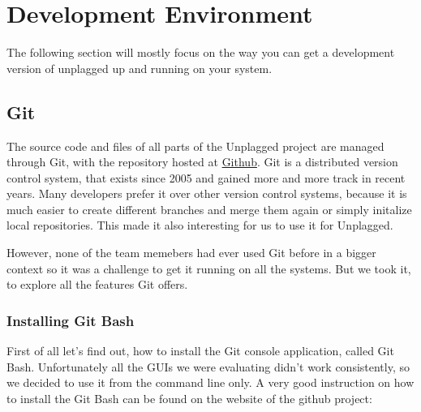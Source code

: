 \section{Development Environment}

The following section will mostly focus on the way you can get a development version of unplagged up and running on your 
system.

\subsection{Git}
The source code and files of all parts of the Unplagged project are managed through Git, 
with the repository hosted at \href{https://github.com}{Github}. 
Git is a distributed version control system, that exists since 2005 and gained more and more 
track in recent years. Many developers prefer it over other version control systems, because it is much easier 
to create different branches and merge them again or simply initalize local repositories. This
made it also interesting for us to use it for Unplagged. %

However, none of the team memebers had ever used 
Git before in a bigger context so it was a challenge to get it running on all the systems. But we took it, to explore all the 
features Git offers.




\subsubsection{Installing Git Bash}

First of all let's find out, how to install the Git console application, called Git Bash. 
Unfortunately all the GUIs we were evaluating didn't work consistently, so we decided to use it from the command line 
only. 
A very good instruction on how to install the Git Bash can be found on the website of the github project:

